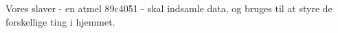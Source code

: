 Vores slaver - en atmel 89c4051 - skal indsamle data, og bruges til at styre de forskellige ting i hjemmet.